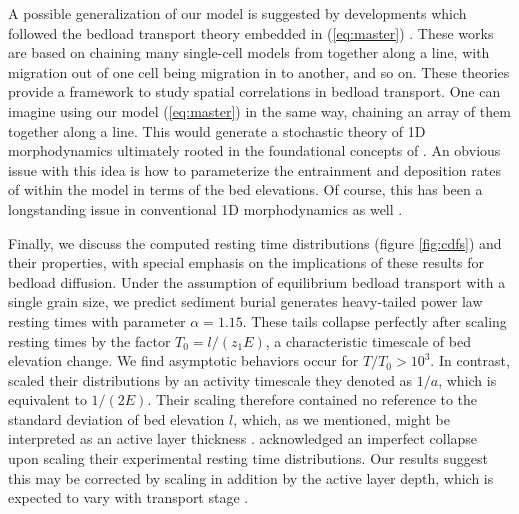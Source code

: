 \documentclass[draft]{agujournal2018}
\begin{document}
A possible generalization of our model is suggested by developments which followed the \citet{Ancey2008} bedload transport theory embedded in (\ref{eq:master}) \citep[e.g.][]{Ancey2014a, Heyman2014, Heyman2015}. 
These works are based on chaining many single-cell models from \citet{Ancey2008} together along a line, with migration out of one cell being migration in to another, and so on. 
These theories provide a framework to study spatial correlations in bedload transport.
One can imagine using our model (\ref{eq:master}) in the same way, chaining an array of them together along a line. This would generate a stochastic theory of 1D morphodynamics ultimately rooted in the foundational concepts of \citet{Einstein1950}.
An obvious issue with this idea is how to parameterize the entrainment and deposition rates of within the model in terms of the bed elevations.
Of course, this has been a longstanding issue in conventional 1D morphodynamics as well \citep[e.g.][]{Tucker2010}.

Finally, we discuss the computed resting time distributions (figure \ref{fig:cdfs}) and their properties, with special emphasis on the implications of these results for bedload diffusion.
Under the assumption of equilibrium bedload transport with a single grain size, we predict sediment burial generates heavy-tailed power law resting times with parameter $\alpha = 1.15$.
These tails collapse perfectly after scaling resting times by the factor $T_0 = l/(z_1 E)$, a characteristic timescale of bed elevation change.
We find asymptotic behaviors occur for $T/T_0>10^3$.
In contrast, \citet{Martin2014} scaled their distributions by an activity timescale they denoted as $1/a$, which is equivalent to $1/(2E)$.
Their scaling therefore contained no reference to the standard deviation of bed elevation $l$, which, as we mentioned, might be interpreted as an active layer thickness \citep{Church2017}.
\citet{Martin2014} acknowledged an imperfect collapse upon scaling their experimental resting time distributions. 
Our results suggest this may be corrected by scaling in addition by the active layer depth, which is expected to vary with transport stage \citep{Church2017}.
\end{document}
